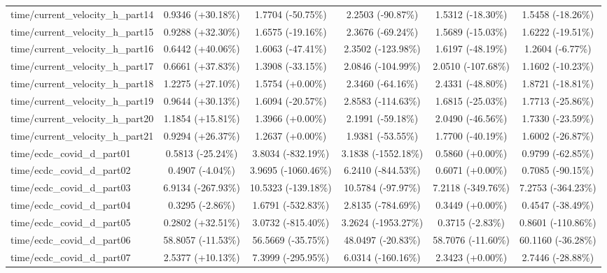 \begin{table}[htbp]
{\begin{tabular}{lccccc}
time/current\_velocity\_h\_part14 & 0.9346 (+30.18\%) & 1.7704 (-50.75\%) & 2.2503 (-90.87\%) & 1.5312 (-18.30\%) & 1.5458 (-18.26\%) \\
time/current\_velocity\_h\_part15 & 0.9288 (+32.30\%) & 1.6575 (-19.16\%) & 2.3676 (-69.24\%) & 1.5689 (-15.03\%) & 1.6222 (-19.51\%) \\
time/current\_velocity\_h\_part16 & 0.6442 (+40.06\%) & 1.6063 (-47.41\%) & 2.3502 (-123.98\%) & 1.6197 (-48.19\%) & 1.2604 (-6.77\%) \\
time/current\_velocity\_h\_part17 & 0.6661 (+37.83\%) & 1.3908 (-33.15\%) & 2.0846 (-104.99\%) & 2.0510 (-107.68\%) & 1.1602 (-10.23\%) \\
time/current\_velocity\_h\_part18 & 1.2275 (+27.10\%) & 1.5754 (+0.00\%) & 2.3460 (-64.16\%) & 2.4331 (-48.80\%) & 1.8721 (-18.81\%) \\
time/current\_velocity\_h\_part19 & 0.9644 (+30.13\%) & 1.6094 (-20.57\%) & 2.8583 (-114.63\%) & 1.6815 (-25.03\%) & 1.7713 (-25.86\%) \\
time/current\_velocity\_h\_part20 & 1.1854 (+15.81\%) & 1.3966 (+0.00\%) & 2.1991 (-59.18\%) & 2.0490 (-46.56\%) & 1.7330 (-23.59\%) \\
time/current\_velocity\_h\_part21 & 0.9294 (+26.37\%) & 1.2637 (+0.00\%) & 1.9381 (-53.55\%) & 1.7700 (-40.19\%) & 1.6002 (-26.87\%) \\
time/ecdc\_covid\_d\_part01 & 0.5813 (-25.24\%) & 3.8034 (-832.19\%) & 3.1838 (-1552.18\%) & 0.5860 (+0.00\%) & 0.9799 (-62.85\%) \\
time/ecdc\_covid\_d\_part02 & 0.4907 (-4.04\%) & 3.9695 (-1060.46\%) & 6.2410 (-844.53\%) & 0.6071 (+0.00\%) & 0.7085 (-90.15\%) \\
time/ecdc\_covid\_d\_part03 & 6.9134 (-267.93\%) & 10.5323 (-139.18\%) & 10.5784 (-97.97\%) & 7.2118 (-349.76\%) & 7.2753 (-364.23\%) \\
time/ecdc\_covid\_d\_part04 & 0.3295 (-2.86\%) & 1.6791 (-532.83\%) & 2.8135 (-784.69\%) & 0.3449 (+0.00\%) & 0.4547 (-38.49\%) \\
time/ecdc\_covid\_d\_part05 & 0.2802 (+32.51\%) & 3.0732 (-815.40\%) & 3.2624 (-1953.27\%) & 0.3715 (-2.83\%) & 0.8601 (-110.86\%) \\
time/ecdc\_covid\_d\_part06 & 58.8057 (-11.53\%) & 56.5669 (-35.75\%) & 48.0497 (-20.83\%) & 58.7076 (-11.60\%) & 60.1160 (-36.28\%) \\
time/ecdc\_covid\_d\_part07 & 2.5377 (+10.13\%) & 7.3999 (-295.95\%) & 6.0314 (-160.16\%) & 2.3423 (+0.00\%) & 2.7446 (-28.88\%) \\

\end{tabular}}
\end{table}
